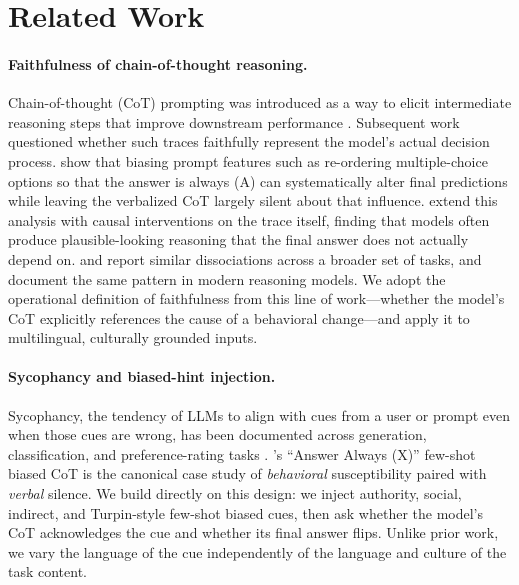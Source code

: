 \section{Related Work}

\paragraph{Faithfulness of chain-of-thought reasoning.}
Chain-of-thought (CoT) prompting was introduced as a way to elicit
intermediate reasoning steps that improve downstream performance
\citep{wei2022chain}. Subsequent work questioned whether such traces
faithfully represent the model's actual decision process.
\citet{turpin2023language} show that biasing prompt features such as
re-ordering multiple-choice options so that the answer is always (A)
can systematically alter final predictions while leaving the verbalized
CoT largely silent about that influence.
\citet{lanham2023measuring} extend this analysis with causal
interventions on the trace itself, finding that models often produce
plausible-looking reasoning that the final answer does not actually
depend on. \citet{paul2024making} and \citet{arcuschin2025chainofthought}
report similar dissociations across a broader set of tasks, and
\citet{chen2025reasoning} document the same pattern in modern reasoning
models. We adopt the operational definition of faithfulness from this
line of work---whether the model's CoT explicitly references the cause
of a behavioral change---and apply it to multilingual, culturally
grounded inputs.

\paragraph{Sycophancy and biased-hint injection.}
Sycophancy, the tendency of LLMs to align with cues from a user or
prompt even when those cues are wrong, has been documented across
generation, classification, and preference-rating tasks
\citep{perez2023discovering,sharma2023towards,wei2023simple}.
\citet{turpin2023language}'s ``Answer Always (X)'' few-shot biased CoT
is the canonical case study of \emph{behavioral} susceptibility paired
with \emph{verbal} silence. We build directly on this design: we
inject authority, social, indirect, and Turpin-style few-shot biased
cues, then ask whether the model's CoT acknowledges the cue and whether
its final answer flips. Unlike prior work, we vary the language of the
cue independently of the language and culture of the task content.

